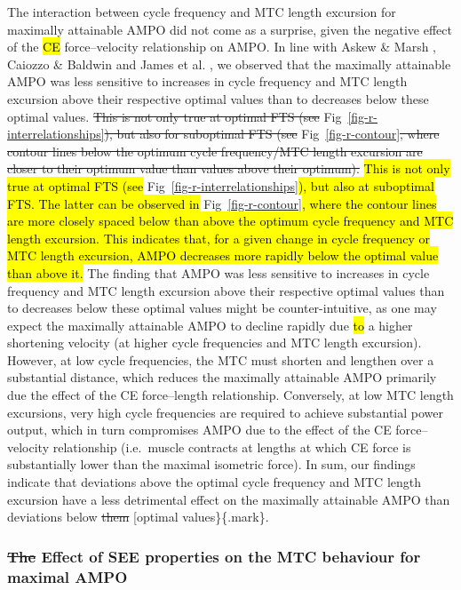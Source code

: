 \documentclass[
  10pt,
  letterpaper,
]{article}
\begin{document}
The interaction between cycle frequency and MTC length excursion for
maximally attainable AMPO did not come as a surprise, given the negative
effect of the \hl{CE} force--velocity relationship on AMPO. In line with
{Askew \& Marsh \citep{askew_effects_1997}}, {Caiozzo \& Baldwin
\citep{caiozzo_determinants_1997}} and {James et al.
\citep{james_isometric_1996}}, we observed that the maximally attainable
AMPO was less sensitive to increases in cycle frequency and MTC length
excursion above their respective optimal values than to decreases below
these optimal values. \st{This is not only true at optimal FTS (see}
Fig~\ref{fig-r-interrelationships}\st{), but also for suboptimal FTS
(see} Fig~\ref{fig-r-contour}\st{, where contour lines below the optimum
cycle frequency/MTC length excursion are closer to their optimum value
than values above their optimum).} \hl{This is not only true at optimal
FTS (see} Fig~\ref{fig-r-interrelationships}\hl{), but also at
suboptimal FTS. The latter can be observed in}
Fig~\ref{fig-r-contour}\hl{, where the contour lines are more closely
spaced below than above the optimum cycle frequency and MTC length
excursion. This indicates that, for a given change in cycle frequency or
MTC length excursion, AMPO decreases more rapidly below the optimal
value than above it.} The finding that AMPO was less sensitive to
increases in cycle frequency and MTC length excursion above their
respective optimal values than to decreases below these optimal values
might be counter-intuitive, as one may expect the maximally attainable
AMPO to decline rapidly due \hl{to} a higher shortening velocity (at
higher cycle frequencies and MTC length excursion). However, at low
cycle frequencies, the MTC must shorten and lengthen over a substantial
distance, which reduces the maximally attainable AMPO primarily due the
effect of the CE force--length relationship. Conversely, at low MTC
length excursions, very high cycle frequencies are required to achieve
substantial power output, which in turn compromises AMPO due to the
effect of the CE force--velocity relationship (i.e.~muscle contracts at
lengths at which CE force is substantially lower than the maximal
isometric force). In sum, our findings indicate that deviations above
the optimal cycle frequency and MTC length excursion have a less
detrimental effect on the maximally attainable AMPO than deviations
below \st{them} {[}optimal values\}\{.mark\}.

\subsubsection{\texorpdfstring{\st{The} Effect of SEE properties on the
MTC behaviour for maximal
AMPO}{The Effect of SEE properties on the MTC behaviour for maximal AMPO}}\label{the-effect-of-see-properties-on-the-mtc-behaviour-for-maximal-ampo}
\end{document}
